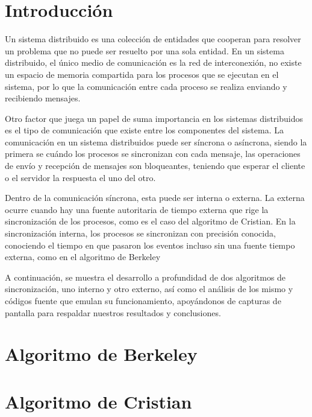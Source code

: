 \documentclass[letterpaper]{article}
\begin{document}

\tableofcontents{}

\section{Introducción}\label{Introduccion}
Un sistema distribuido es una colección de entidades que cooperan para
resolver un problema que no puede ser resuelto por una sola entidad. En un
sistema distribuido, el único medio de comunicación es la red de
interconexión, no existe un espacio de memoria compartida para los procesos
que se ejecutan en el sistema, por lo que la comunicación entre cada
proceso se realiza enviando y recibiendo mensajes.

Otro factor que juega un papel de suma importancia en los sistemas
distribuidos es el tipo de comunicación que existe entre los componentes
del sistema. La comunicación en un sistema distribuidos puede ser síncrona
o asíncrona, siendo la primera se cuándo los procesos se sincronizan con
cada mensaje, las operaciones de envío y recepción de mensajes son
bloqueantes, teniendo que esperar el cliente o el servidor la respuesta el
uno del otro.

Dentro de la comunicación síncrona, esta puede ser interna o externa. La
externa ocurre cuando hay una fuente autoritaria de tiempo externa que rige
la sincronización de los procesos, como es el caso del algoritmo de
Cristian. En la sincronización interna, los procesos se sincronizan con
precisión conocida, conociendo el tiempo en que pasaron los eventos incluso
sin una fuente tiempo externa, como en el algoritmo de Berkeley

A continuación, se muestra el desarrollo a profundidad de dos algoritmos de
sincronización, uno interno y otro externo, así como el análisis de los
mismo y códigos fuente que emulan su funcionamiento, apoyándonos de
capturas de pantalla para respaldar nuestros resultados y conclusiones.

\clearpage{}

\section{Algoritmo de Berkeley}\label{sec:algor-de-berk}

\clearpage
\section{Algoritmo de Cristian}\label{sec:algor-de-cris}
\nocite{*}




\renewcommand\listoflistingscaption{Índice de códigos}
\newpage
\listoflistings\listoffigures
\end{document}
